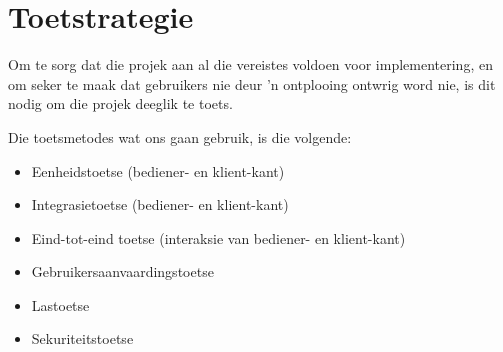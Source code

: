 \section{Toetstrategie}

Om te sorg dat die projek aan al die vereistes voldoen voor implementering, en om seker te maak dat gebruikers nie deur 'n ontplooing ontwrig word nie, is dit nodig om die projek deeglik te toets.

Die toetsmetodes wat ons gaan gebruik, is die volgende:
\begin{itemize}
    \item Eenheidstoetse (bediener- en klient-kant)
    \item Integrasietoetse (bediener- en klient-kant)
    \item Eind-tot-eind toetse (interaksie van bediener- en klient-kant)
    \item Gebruikersaanvaardingstoetse
    \item Lastoetse
    \item Sekuriteitstoetse
\end{itemize}
